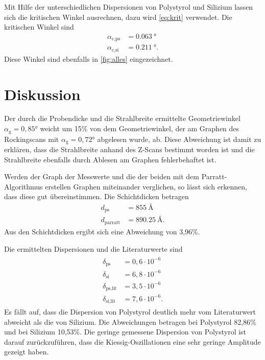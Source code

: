 Mit Hilfe der unterschiedlichen Dispersionen von Polystyrol und Silizium lassen sich die kritischen Winkel ausrechnen,
dazu wird \autoref{eq:krit} verwendet.
Die kritischen Winkel sind
\begin{align*}
    \alpha_\text{c,ps}& = \SI{0,063}{\degree}\\
    \alpha_\text{c,si}& = \SI{0.211}{\degree}.
\end{align*}
Diese Winkel sind ebenfalls in \autoref{fig:alles} eingezeichnet.

\section{Diskussion}
Der durch die Probendicke und die Strahlbreite ermittelte Geometriewinkel $\alpha_\text{g} =0,85°$ weicht um 15\%
von dem Geometriewinkel, der am Graphen des Rockingscans mit $\alpha_\text{g} =0,72°$ abgelesen wurde, ab. 
Diese Abweichung ist damit zu erklären, dass die Strahlbreite anhand des Z-Scans bestimmt worden ist und die Strahlbreite
ebenfalls durch Ablesen am Graphen fehlerbehaftet ist.

Werden der Graph der Messwerte und die der beiden mit dem Parratt-Algorithmus erstellen Graphen miteinander verglichen, so lässt sich 
erkennen, dass diese gut übereinstimmen.
Die Schichtdicken betragen
\begin{align*}
    d_\text{ps} &= \SI{855}{\angstrom}\\
    d_\text{parratt} &= \SI{890,25}{\angstrom}.
\end{align*}
Aus den Schichtdicken ergibt sich eine Abweichung von 3,96\%.

Die ermittelten Dispersionen und die Literaturwerte\cite{V44old} sind
\begin{align}
    \begin{split}    
        \delta_\text{ps} &= 0,6\cdot 10^{-6}\\
        \delta_\text{si}&= 6,8\cdot 10^{-6} \\
        \delta_\text{ps,lit} &= 3,5\cdot 10^{-6}\\
        \delta_\text{si,lit}&= 7,6\cdot 10^{-6}.
    \end{split} 
\end{align}
Es fällt auf, dass die Dispersion von Polystyrol deutlich mehr vom Literaturwert abweicht als die von Silizium.
Die Abweichungen betragen bei Polystyrol 82,86\% und bei Silizium 10,53\%.
Die geringe gemessene Dispersion von Polystyrol ist darauf zurückzuführen, dass die Kiessig-Oszillationen eine
sehr geringe Amplitude gezeigt haben.


